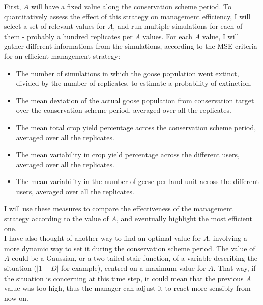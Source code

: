 \documentclass[12pt,a4paper]{article}
\begin{document}
First, $A$ will have a fixed value along the conservation scheme period.
To quantitatively assess the effect of this strategy on management efficiency, I will select a set of relevant values for $A$, and run multiple simulations for each of them - probably a hundred replicates per $A$ values.
For each $A$ value, I will gather different informations from the simulations, according to the MSE criteria for an efficient management strategy:
\begin{itemize}
	\item The number of simulations in which the goose population went extinct, divided by the number of replicates, to estimate a probability of extinction.
	\item The mean deviation of the actual goose population from conservation target over the conservation scheme period, averaged over all the replicates.
	\item The mean total crop yield percentage across the conservation scheme period, averaged over all the replicates.
	\item The mean variability in crop yield percentage across the different users, averaged over all the replicates.
	\item The mean variability in the number of geese per land unit across the different users, averaged over all the replicates.
\end{itemize}
I will use these measures to compare the effectiveness of the management strategy according to the value of $A$, and eventually highlight the most efficient one.\\

I have also thought of another way to find an optimal value for $A$, involving a more dynamic way to set it during the conservation scheme period.
The value of $A$ could be a Gaussian, or a two-tailed stair function, of a variable describing the situation ($|1-D|$ for example), centred on a maximum value for $A$.
That way, if the situation is concerning at this time step, it could mean that the previous $A$ value was too high, thus the manager can adjust it to react more sensibly from now on.
\end{document}
